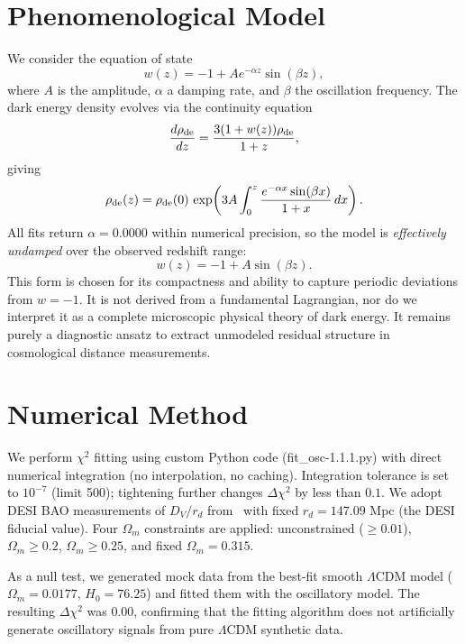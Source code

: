 \documentclass[10pt,a4paper,twocolumn]{article}
\begin{document}
\section{Phenomenological Model}
We consider the equation of state
\[
w(z) = -1 + A e^{-\alpha z}\sin(\beta z),
\]
where $A$ is the amplitude, $\alpha$ a damping rate, and $\beta$ the oscillation frequency. The dark energy density evolves via the continuity equation
\[
\frac{d\rho_{\rm de}}{dz} = \frac{3(1+w(z))\rho_{\rm de}}{1+z},
\]
giving
\[
\rho_{\rm de}(z) = \rho_{\rm de}(0)\,\exp\!\left(3A\int_0^z \frac{e^{-\alpha x}\sin(\beta x)}{1+x}\,dx\right).
\]
All fits return $\alpha=0.0000$ within numerical precision, so the model is \emph{effectively undamped} over the observed redshift range:
\[
w(z) = -1 + A\sin(\beta z).
\]
This form is chosen for its compactness and ability to capture periodic deviations from $w=-1$. It is not derived from a fundamental Lagrangian, nor do we interpret it as a complete microscopic physical theory of dark energy. It remains purely a diagnostic ansatz to extract unmodeled residual structure in cosmological distance measurements.

\section{Numerical Method}
We perform $\chi^2$ fitting using custom Python code (fit\_osc-1.1.1.py) with direct numerical integration (no interpolation, no caching). Integration tolerance is set to $10^{-7}$ (limit 500); tightening further changes $\Delta\chi^2$ by less than $0.1$. We adopt DESI BAO measurements of $D_V/r_d$ from~\cite{DESI2024} with fixed $r_d=147.09$ Mpc (the DESI fiducial value). Four $\Omega_m$ constraints are applied: unconstrained ($\ge0.01$), $\Omega_m\ge0.2$, $\Omega_m\ge0.25$, and fixed $\Omega_m=0.315$.

As a null test, we generated mock data from the best-fit smooth $\Lambda$CDM model ($\Omega_m=0.0177$, $H_0=76.25$) and fitted them with the oscillatory model. The resulting $\Delta\chi^2$ was $0.00$, confirming that the fitting algorithm does not artificially generate oscillatory signals from pure $\Lambda$CDM synthetic data.
\end{document}
